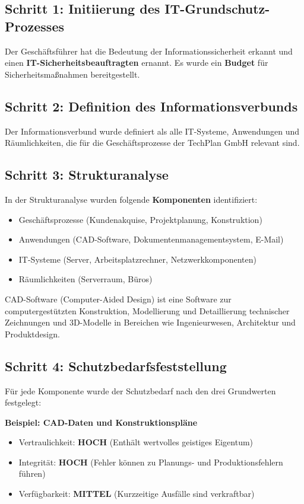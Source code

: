 \documentclass{orgstandard}
\begin{document}
\subsection{Schritt 1: Initiierung des IT-Grundschutz-Prozesses}
\label{sec:orgf9c4745}
Der Geschäftsführer hat die Bedeutung der Informationssicherheit erkannt und einen \textbf{IT-Sicherheitsbeauftragten} ernannt. Es wurde ein \textbf{Budget} für Sicherheitsmaßnahmen bereitgestellt.

\subsection{Schritt 2: Definition des Informationsverbunds}
\label{sec:org11afe64}
Der Informationsverbund wurde definiert als alle IT-Systeme, Anwendungen und Räumlichkeiten, die für die Geschäftsprozesse der TechPlan GmbH relevant sind.

\subsection{Schritt 3: Strukturanalyse}
\label{sec:org54f6852}
In der Strukturanalyse wurden folgende \textbf{Komponenten} identifiziert:
\begin{itemize}
\item Geschäftsprozesse (Kundenakquise, Projektplanung, Konstruktion)
\item Anwendungen (CAD-Software, Dokumentenmanagementsystem, E-Mail)
\item IT-Systeme (Server, Arbeitsplatzrechner, Netzwerkkomponenten)
\item Räumlichkeiten (Serverraum, Büros)
\end{itemize}

\begin{NOTES}
CAD-Software (Computer-Aided Design) ist eine Software zur computergestützten Konstruktion, Modellierung und Detaillierung technischer Zeichnungen und 3D-Modelle in Bereichen wie Ingenieurwesen, Architektur und Produktdesign.
\end{NOTES}

\subsection{Schritt 4: Schutzbedarfsfeststellung}
\label{sec:org0ff97ce}

Für jede Komponente wurde der Schutzbedarf nach den drei Grundwerten festgelegt:

\textbf{Beispiel: CAD-Daten und Konstruktionspläne}
\begin{itemize}
\item Vertraulichkeit: \textbf{HOCH} (Enthält wertvolles geistiges Eigentum)
\item Integrität: \textbf{HOCH} (Fehler können zu Planungs- und Produktionsfehlern führen)
\item Verfügbarkeit: \textbf{MITTEL} (Kurzzeitige Ausfälle sind verkraftbar)
\end{itemize}
\end{document}
